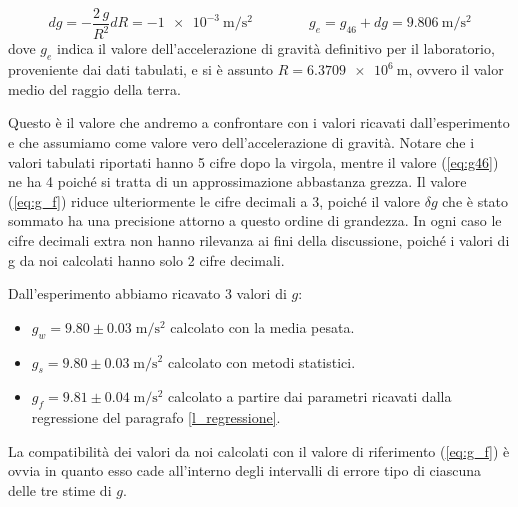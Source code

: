 \begin{equation}
    dg = - \frac{2\,g}{R^2} dR = \SI{-1e-3}{\meter\per\square\second}
    \qquad \qquad
    g_e = g_{46} + dg = \SI{9.806}{\meter\per\square\second}
    \label{eq:g_f}
\end{equation}
%
dove $g_e$ indica il valore dell'accelerazione di gravità definitivo per il laboratorio, proveniente dai dati tabulati,
e si è assunto $R = \SI{6.3709e6}{\metre}$, ovvero il valor medio del raggio della terra.

Questo è il valore che andremo a confrontare con i valori ricavati dall'esperimento e che assumiamo come valore vero
dell'accelerazione di gravità. Notare che i valori tabulati riportati hanno 5 cifre dopo la virgola, mentre il valore (\ref{eq:g46})
ne ha 4 poiché si tratta di un approssimazione abbastanza grezza. Il valore (\ref{eq:g_f}) riduce ulteriormente le cifre decimali a 3,
poiché il valore $\delta g$ che è stato sommato ha una precisione attorno a questo ordine di grandezza. In ogni caso
le cifre decimali extra non hanno rilevanza ai fini della discussione, poiché i valori di g da noi calcolati hanno solo 2
cifre decimali. 

Dall'esperimento abbiamo ricavato 3 valori di $g$:

\begin{itemize}
    \item{$g_w = 9.80 \pm 0.03 \; \si{\metre\per\square\second}$ calcolato con la media pesata.}
    \item{$g_s = 9.80 \pm 0.03 \; \si{\metre\per\square\second}$ calcolato con metodi statistici.}
    \item{$g_f = 9.81 \pm 0.04 \; \si{\metre\per\square\second}$ calcolato a partire dai parametri ricavati dalla regressione
        del paragrafo \ref{l_regressione}.}
\end{itemize}

La compatibilità dei valori da noi calcolati con il valore di riferimento (\ref{eq:g_f}) è ovvia in quanto esso cade all'interno
degli intervalli di errore tipo di ciascuna delle tre stime di $g$.

